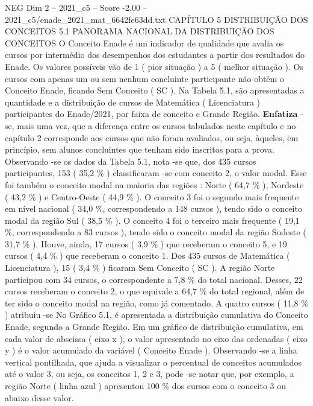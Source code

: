 \begin{textsample}{NEG Dim 2 – 2021\_c5 – Score -2.00 – 2021\_c5/enade\_2021\_mat\_6642fe63dd.txt}  \label{ex:f2_neg_144}
CAPÍTULO 5 DISTRIBUIÇÃO DOS CONCEITOS 5.1 PANORAMA NACIONAL DA DISTRIBUIÇÃO DOS CONCEITOS O Conceito Enade é um indicador de qualidade que avalia os cursos por intermédio dos desempenhos dos estudantes a partir dos resultados do Enade.
Os valores possíveis vão de 1 ( pior situação ) a 5 ( melhor situação ).
Os cursos com apenas um ou sem nenhum concluinte participante não obtêm o Conceito Enade, ficando Sem Conceito ( SC ).
Na Tabela 5.1, são apresentadas a quantidade e a distribuição de cursos de Matemática ( Licenciatura ) participantes do Enade/2021, por faixa de conceito e Grande Região. \textbf{Enfatiza} -se, mais uma vez, que a diferença entre os cursos tabulados neste capítulo e no capítulo 2 corresponde aos cursos que não foram avaliados, ou seja, àqueles, em princípio, sem alunos concluintes que tenham sido inscritos para a prova.
Observando -se os dados da Tabela 5.1, nota -se que, dos 435 cursos participantes, 153 ( 35,2 \% ) classificaram -se com conceito 2, o valor modal.
Esse foi também o conceito modal na maioria das regiões : Norte ( 64,7 \% ), Nordeste ( 43,2 \% ) e Centro-Oeste ( 44,9 \% ).
O conceito 3 foi o segundo mais frequente em nível nacional ( 34,0 \%, correspondendo a 148 cursos ), tendo sido o conceito modal da região Sul ( 38,5 \% ).
O conceito 4 foi o terceiro mais frequente ( 19,1 \%, correspondendo a 83 cursos ), tendo sido o conceito modal da região Sudeste ( 31,7 \% ).
Houve, ainda, 17 cursos ( 3,9 \% ) que receberam o conceito 5, e 19 cursos ( 4,4 \% ) que receberam o conceito 1.
Dos 435 cursos de Matemática ( Licenciatura ), 15 ( 3,4 \% ) ficaram Sem Conceito ( SC ).
A região Norte participou com 34 cursos, o correspondente a 7,8 \% do total nacional.
Desses, 22 cursos receberam o conceito 2, o que equivale a 64,7 \% do total regional, além de ter sido o conceito modal na região, como já comentado.
A quatro cursos ( 11,8 \% ) atribuiu -se No Gráfico 5.1, é apresentada a distribuição cumulativa do Conceito Enade, segundo a Grande Região.
Em um gráfico de distribuição cumulativa, em cada valor de abscissa ( eixo x ), o valor apresentado no eixo das ordenadas ( eixo y ) é o valor acumulado da variável ( Conceito Enade ).
Observando -se a linha vertical pontilhada, que ajuda a visualizar o percentual de conceitos acumulados até o valor 3, ou seja, os conceitos 1, 2 e 3, pode -se notar que, por exemplo, a região Norte ( linha azul ) apresentou 100 \% dos cursos com o conceito 3 ou abaixo desse valor.

\end{textsample}
